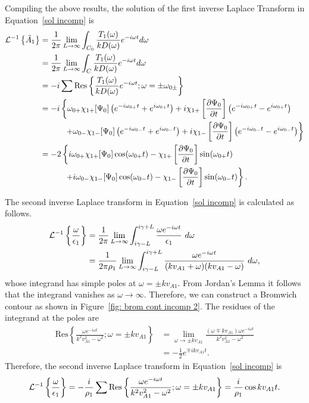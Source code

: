\documentclass[12pt]{../style-files/ociamthesis}
\begin{document}
Compiling the above results, the solution of the first inverse Laplace Transform in Equation~\eqref{sol incomp} is
\begin{align}
\mathcal{L}^{-1}\left\{ \tilde{A}_1 \right\} &= \frac{1}{2\pi} \lim_{L \to \infty} \int_{C_0} \frac{T_1(\omega)}{kD(\omega)} e^{-i\omega t} d\omega \\
&= \frac{1}{2\pi} \lim_{L \to \infty} \int_{C} \frac{T_1(\omega)}{kD(\omega)} e^{-i\omega t} d\omega \notag \\
&= -i \sum \mathrm{Res}\left\{\frac{T_1(\omega)}{kD(\omega)}e^{-i\omega t}; \omega = \pm \omega_{0\pm} \right\} \notag \\
&= -i \left\{\omega_{0+}\chi_{1+}[\Psi_0] \left(e^{-i\omega_{0+} t} + e^{i\omega_{0+} t}\right) + i\chi_{1+}\left[ \frac{\partial \Psi_0}{\partial t} \right] \left(e^{-i\omega_{0+} t} - e^{i\omega_{0+} t}\right) \right. \notag \\
& \qquad\quad \left. + \omega_{0-}\chi_{1-}[\Psi_0] \left(e^{-i\omega_{0-} t} + e^{i\omega_{0-} t}\right) + i\chi_{1-}\left[ \frac{\partial \Psi_0}{\partial t} \right] \left(e^{-i\omega_{0-} t} - e^{i\omega_{0-} t}\right)\right\} \notag \\
&= -2 \left\{ i\omega_{0+}\chi_{1+}[\Psi_0] \cos(\omega_{0+} t) - \chi_{1+}\left[ \frac{\partial \Psi_0}{\partial t} \right] \sin(\omega_{0+} t) \right. \notag \\
& \qquad\quad \left. + i\omega_{0-}\chi_{1-}[\Psi_0] \cos(\omega_{0-} t) - \chi_{1-}\left[ \frac{\partial \Psi_0}{\partial t} \right] \sin(\omega_{0-} t) \right\}.
\end{align}


The second inverse Laplace transform in Equation~\eqref{sol incomp} is calculated as follows.
\begin{align}
\mathcal{L}^{-1}\left\{ \frac{\omega}{\epsilon_1} \right\} &= \frac{1}{2\pi}\lim_{L \to \infty} \int_{i\gamma - L}^{i\gamma + L} \frac{\omega e^{-i\omega t}}{\epsilon_1} ~d\omega \notag \\
&= \frac{1}{2\pi\rho_1}\lim_{L \to \infty} \int_{i\gamma - L}^{i\gamma + L} \frac{\omega e^{-i\omega t}}{(kv_{A1} + \omega)(kv_{A1} - \omega)} ~d\omega,
\end{align}
whose integrand has simple poles at $\omega = \pm k v_{A1}$. From Jordan's Lemma it follows that the integrand vanishes as $\omega \to \infty$. Therefore, we can construct a Bromwich contour as shown in Figure~\ref{fig: brom cont incomp 2}. The residues of the integrand at the poles are
\begin{align}
\mathrm{Res}\left\{\frac{\omega e^{-i\omega t}}{k^2v_{A1}^2 - \omega^2}; \omega = \pm kv_{A1} \right\} &= 
\lim_{\omega \to \pm kv_{A1}} \frac{(\omega \mp kv_{A1}) \omega e^{-i\omega t}}{k^2v_{A1}^2 - \omega^2} \\ 
&= -\frac{1}{2}e^{\mp ikv_{A1} t}.
\end{align}
Therefore, the second inverse Laplace transform in Equation~\eqref{sol incomp} is
\begin{equation}
\mathcal{L}^{-1}\left\{ \frac{\omega}{\epsilon_1} \right\} = -\frac{i}{\rho_1} \sum \mathrm{Res} \left\{ \frac{\omega e^{-i\omega t}}{k^2v_{A1}^2 - \omega^2}; \omega = \pm kv_{A1} \right\} = \frac{i}{\rho_1}\cos{kv_{A1}t}.
\end{equation}
\end{document}
